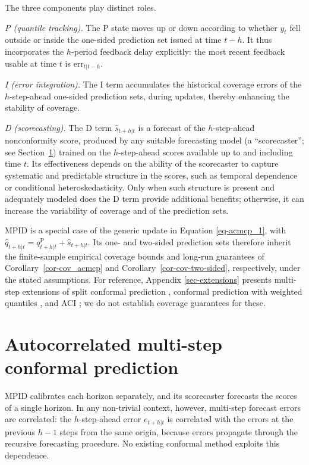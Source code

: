 \documentclass[
  american,
  12pt]{article}
\theoremstyle{plain}
\theoremstyle{plain}
\theoremstyle{remark}
\begin{document}
The three components play distinct roles.

\emph{P (quantile tracking).} The P state moves up or down according to
whether \(y_t\) fell outside or inside the one-sided prediction set
issued at time \(t-h\). It thus incorporates the \(h\)-period feedback
delay explicitly: the most recent feedback usable at time \(t\) is
\(\mathrm{err}_{t|t-h}\).

\emph{I (error integration).} The I term accumulates the historical
coverage errors of the \(h\)-step-ahead one-sided prediction sets,
during updates, thereby enhancing the stability of coverage.

\emph{D (scorecasting).} The D term \(\hat{s}_{t+h|t}\) is a forecast of
the \(h\)-step-ahead nonconformity score, produced by any suitable
forecasting model (a ``scorecaster''; see Section~\ref{sec-acmcp})
trained on the \(h\)-step-ahead scores available up to and including
time \(t\). Its effectiveness depends on the ability of the scorecaster
to capture systematic and predictable structure in the scores, such as
temporal dependence or conditional heteroskedasticity. Only when such
structure is present and adequately modeled does the D term provide
additional benefits; otherwise, it can increase the variability of
coverage and of the prediction sets.

MPID is a special case of the generic update in Equation
\eqref{eq-acmcp_1}, with
\(\hat q_{t+h|t}=q^{\mathrm P}_{t+h|t}+\hat s_{t+h|t}\). Its one- and
two-sided prediction sets therefore inherit the finite-sample empirical
coverage bounds and long-run guarantees of Corollary~\ref{cor-cov_acmcp}
and Corollary~\ref{cor-cov-two-sided}, respectively, under the stated
assumptions. For reference, Appendix \ref{sec-extensions} presents
multi-step extensions of split conformal prediction \citep{vovk2005},
conformal prediction with weighted quantiles \citep{barber2023}, and ACI
\citep{gibbs2021}; we do not establish coverage guarantees for these.

\section{Autocorrelated multi-step conformal
prediction}\label{sec-acmcp}

MPID calibrates each horizon separately, and its scorecaster forecasts
the scores of a single horizon. In any non-trivial context, however,
multi-step forecast errors are correlated: the \(h\)-step-ahead error
\(e_{t+h|t}\) is correlated with the errors at the previous \(h-1\)
steps from the same origin, because errors propagate through the
recursive forecasting procedure. No existing conformal method exploits
this dependence.
\end{document}
